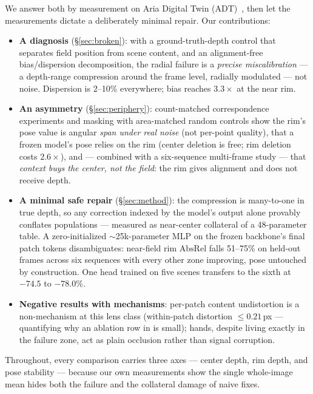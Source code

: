 \documentclass{article}
\newcommand{\absrel}{\mathrm{AbsRel}}
\begin{document}
We answer both by measurement on Aria Digital Twin (ADT)~\cite{adt}, then let
the measurements dictate a deliberately minimal repair. Our contributions:

\begin{itemize}
  \item \textbf{A diagnosis} (\S\ref{sec:broken}): with a ground-truth-depth
  control that separates field position from scene content, and an
  alignment-free bias/dispersion decomposition, the radial failure is a
  \emph{precise miscalibration} --- a depth-range compression around the frame
  level, radially modulated --- not noise. Dispersion is 2--10\% everywhere;
  bias reaches $3.3\times$ at the near rim.
  \item \textbf{An asymmetry} (\S\ref{sec:periphery}): count-matched
  correspondence experiments and masking with area-matched random controls
  show the rim's pose value is angular \emph{span under real noise} (not
  per-point quality), that a frozen model's pose relies on the rim (center
  deletion is free; rim deletion costs $2.6\times$), and --- combined with a
  six-sequence multi-frame study --- that \emph{context buys the center, not
  the field}: the rim gives alignment and does not receive depth.
  \item \textbf{A minimal safe repair} (\S\ref{sec:method}): the compression
  is many-to-one in true depth, so any correction indexed by the model's
  output alone provably conflates populations --- measured as near-center
  collateral of a 48-parameter table. A zero-initialized $\sim$25k-parameter
  MLP on the frozen backbone's final patch tokens disambiguates: near-field
  rim $\absrel$ falls 51--75\% on held-out frames across six sequences with
  every other zone improving, pose untouched by construction. One head
  trained on five scenes transfers to the sixth at $-74.5$ to $-78.0\%$.
  \item \textbf{Negative results with mechanisms}: per-patch content
  undistortion is a non-mechanism at this lens class (within-patch distortion
  $\le 0.21$\,px --- quantifying why an ablation row in \cite{raytun3r} is
  small); hands, despite living exactly in the failure zone, act as plain
  occlusion rather than signal corruption.
\end{itemize}

Throughout, every comparison carries three axes --- center depth, rim depth,
and pose stability --- because our own measurements show the single
whole-image mean hides both the failure and the collateral damage of naive
fixes.
\end{document}

